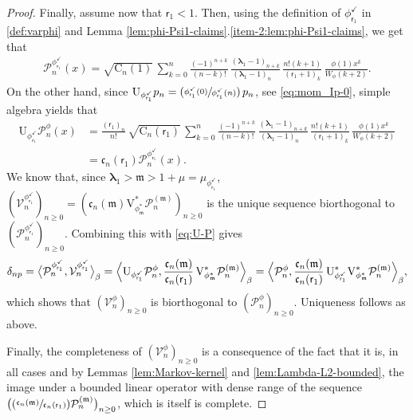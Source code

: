 \documentclass[JEP,XML,SOM,Unicode]{cedram}
\newcommand{\Psfrac}[2]{(\sfrac{#1}{#2})}
\theoremstyle{plain}
\theoremstyle{definition}
\newcommand{\bang}[1]{\ensuremath{ \bigl \langle #1 \bigr\rangle }}
\newcommand{\Bang}[1]{\ensuremath{ \Bigl \langle #1 \Bigr\rangle }}
\renewcommand{\P}{\mathcal{P}}
\newcommand{\V}{\mathcal{V}}
\newcommand{\C}{{\mathrm{C}}}
\newcommand{\m}{\mathfrak{m}}
\newcommand{\lam}{{\bm{\lambda}_1}}
\newcommand{\vat}{{\mathsf{r}_1}}
\newcommand{\phm}{{\phi_\m^*}}
\renewcommand{\varphi}{{\phi_{\vat}^{\checkmark}}}
\let\mo\mu
\begin{document}
\begin{proof}
Finally, assume now that $\vat < 1$. Then, using the definition of $\varphi$ in \eqref{def:varphi} and
Lemma \ref{lem:phi-Psi1-claims}.\eqref{item-2:lem:phi-Psi1-claims}, we get that
\begin{align*}
\P_n^\varphi(x) = \sqrt{\C_n(1)}\, \sum_{k=0}^n \frac{(-1)^{n+k}}{(n-k)!}\, \frac{(\lam-1)_{n+k}}{(\lam-1)_{n\phantom{+k}}}\, \frac{n!(k+1)}{(\vat+1)_{k}}\, \frac{\phi(1) x^k}{W_\phi(k+2)}.
\end{align*}
On the other hand, since $\mathrm{U}_\varphi p_n = \Psfrac{\varphi(0)}{\varphi(n)}\,p_n$, see \eqref{eq:mom_Ip-0}, simple algebra yields that
\begin{equation}
\label{eq:U-P}
\begin{split}
\mathrm{U}_\varphi \P_n^\phi(x) &= \frac{(\vat)_n}{n!}\,\sqrt{\C_n(\vat)}\, \sum_{k=0}^n \frac{(-1)^{n+k}}{(n-k)!}\, \frac{(\lam-1)_{n+k}}{(\lam-1)_{n\phantom{+k}}}\, \frac{n!(k+1)}{(\vat+1)_k}\,\frac{\phi(1) x^k}{W_\phi(k+2)}\\
&= \mathfrak{c}_n(\vat) \P_n^\varphi(x).
\end{split}
\end{equation}
We know that, since $\lam > \m > 1+\mo = \mo_\varphi$, $(\V_n^\varphi)_{n\geq 0} = (\mathfrak{c}_n(\m) {\mathrm{V}}_{\phm}^* \P_n^{(\m)})_{n\geq 0}$ is the unique sequence biorthogonal to $(\P_n^\varphi)_{n \geq 0}$. Combining this with \eqref{eq:U-P} gives
\[
\delta_{np} = \bang{\P_n^\varphi, \V_n^\varphi }_{\beta} =
\Bang{ \mathrm{U}_\varphi \P_n^\phi, \frac{\mathfrak{c}_n(\m)}{\mathfrak{c}_n(\vat)}\, {\mathrm{V}}_{\phm}^* \P_n^{(\m)}}_{\beta}
= \Bang{ \P_n^\phi, \frac{\mathfrak{c}_n(\m)}{\mathfrak{c}_n(\vat)}\, \mathrm{U}_\varphi^* {\mathrm{V}}_{\phm}^* \P_n^{(\m)}}_{\beta},
\]
which shows that $(\V_n^\phi)_{n \geq 0}$ is biorthogonal to $(\P_n^{\phi})_{n \ge 0}$.
Uniqueness follows as above.

Finally, the completeness of $(\V_n^\phi)_{n \geq 0}$ is a consequence of the fact that it is, in all cases and by Lemmas \ref{lem:Markov-kernel} and \ref{lem:Lambda-L2-bounded}, the image under a bounded linear operator with dense range of the sequence $\bigl(\Psfrac{\mathfrak{c}_n(\m)}{\mathfrak{c}_n(\vat)} \P_n^{(\m)}\bigr)_{n \geq 0}$, which is itself is complete.
\end{proof}
\end{document}
